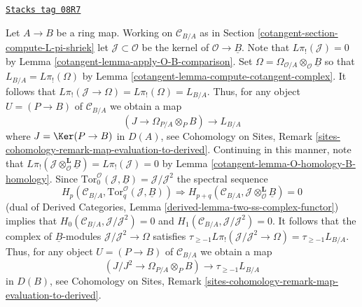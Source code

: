 \begin{remark}
\label{cotangent-remark-make-map}
\href{https://stacks.math.columbia.edu/tag/08R7}{\texttt{Stacks tag 08R7}}

Let $A \to B$ be a ring map.  Working on $\mathcal{C}_{B/A}$ as in
Section \ref{cotangent-section-compute-L-pi-shriek} let
$\mathcal{J} \subset \mathcal{O}$ be the kernel of
$\mathcal{O} \to \underline{B}$. Note that $L\pi_!(\mathcal{J}) = 0$ by
Lemma \ref{cotangent-lemma-apply-O-B-comparison}. Set
$\Omega =  \Omega_{\mathcal{O}/A} \otimes_\mathcal{O} \underline{B}$
so that
$L_{B/A} = L\pi_!(\Omega)$ by Lemma \ref{cotangent-lemma-compute-cotangent-complex}.
It follows that $L\pi_!(\mathcal{J} \to \Omega) = L\pi_!(\Omega) = L_{B/A}$.
Thus, for any object $U = (P \to B)$ of $\mathcal{C}_{B/A}$ we obtain a map
\begin{equation}
\label{equation-comparison-map-A}
(J \to \Omega_{P/A} \otimes_P B) \longrightarrow L_{B/A}
\end{equation}
where $J = \Ker(P \to B)$ in $D(A)$, see
Cohomology on Sites, Remark
\ref{sites-cohomology-remark-map-evaluation-to-derived}.
Continuing in this manner, note that
$L\pi_!(\mathcal{J} \otimes_\mathcal{O}^\mathbf{L} \underline{B}) =
L\pi_!(\mathcal{J}) = 0$ by
Lemma \ref{cotangent-lemma-O-homology-B-homology}.
Since $\text{Tor}_0^\mathcal{O}(\mathcal{J}, \underline{B}) =
\mathcal{J}/\mathcal{J}^2$
the spectral sequence
$$
H_p(\mathcal{C}_{B/A}, \text{Tor}_q^\mathcal{O}(\mathcal{J}, \underline{B}))
\Rightarrow
H_{p + q}(\mathcal{C}_{B/A},
\mathcal{J} \otimes_\mathcal{O}^\mathbf{L} \underline{B}) = 0
$$
(dual of
Derived Categories, Lemma \ref{derived-lemma-two-ss-complex-functor})
implies that
$H_0(\mathcal{C}_{B/A}, \mathcal{J}/\mathcal{J}^2) = 0$
and $H_1(\mathcal{C}_{B/A}, \mathcal{J}/\mathcal{J}^2) = 0$.
It follows that the complex of $\underline{B}$-modules
$\mathcal{J}/\mathcal{J}^2 \to \Omega$ satisfies
$\tau_{\geq -1}L\pi_!(\mathcal{J}/\mathcal{J}^2 \to \Omega) =
\tau_{\geq -1}L_{B/A}$.
Thus, for any object $U = (P \to B)$ of $\mathcal{C}_{B/A}$ we obtain a map
\begin{equation}
\label{equation-comparison-map}
(J/J^2 \to \Omega_{P/A} \otimes_P B) \longrightarrow \tau_{\geq -1}L_{B/A}
\end{equation}
in $D(B)$, see
Cohomology on Sites, Remark
\ref{sites-cohomology-remark-map-evaluation-to-derived}.
\end{remark}

